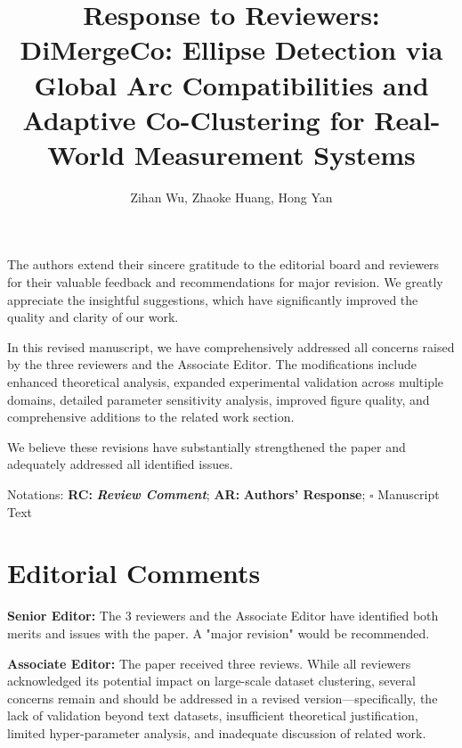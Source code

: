 \documentclass{ar2rc}
\title{Response to Reviewers:\\
DiMergeCo: Ellipse Detection via Global Arc Compatibilities and Adaptive Co-Clustering for Real-World Measurement Systems}
\author{Zihan Wu, Zhaoke Huang, Hong Yan}
\begin{document}
\maketitle

\noindent
The authors extend their sincere gratitude to the editorial board and reviewers for their valuable feedback and recommendations for major revision. We greatly appreciate the insightful suggestions, which have significantly improved the quality and clarity of our work.

In this revised manuscript, we have comprehensively addressed all concerns raised by the three reviewers and the Associate Editor. The modifications include enhanced theoretical analysis, expanded experimental validation across multiple domains, detailed parameter sensitivity analysis, improved figure quality, and comprehensive additions to the related work section.

We believe these revisions have substantially strengthened the paper and adequately addressed all identified issues.

Notations: \textbf{RC:} \textbf{\textit{Review Comment}}; \textbf{AR:} \textbf{Authors' Response}; $\square$ Manuscript Text


\section{Editorial Comments}

\textbf{Senior Editor:} The 3 reviewers and the Associate Editor have identified both merits and issues with the paper. A "major revision" would be recommended.

\textbf{Associate Editor:} The paper received three reviews. While all reviewers acknowledged its potential impact on large-scale dataset clustering, several concerns remain and should be addressed in a revised version—specifically, the lack of validation beyond text datasets, insufficient theoretical justification, limited hyper-parameter analysis, and inadequate discussion of related work.

\end{document}

